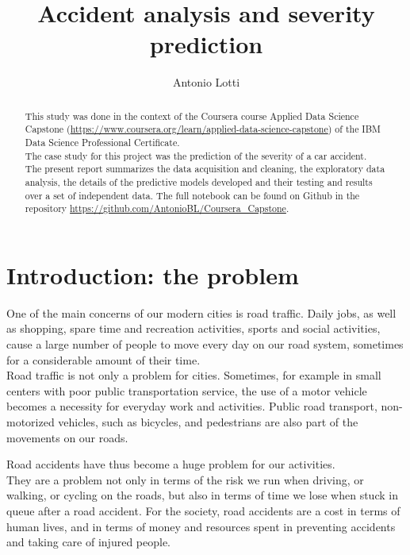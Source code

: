\documentclass[11pt]{article}
\title{Accident analysis and severity prediction}
\author{Antonio Lotti}
\begin{document}
    
    \maketitle
    
\begin{abstract}
This study was done in the context of the Coursera course Applied Data Science Capstone (\url{https://www.coursera.org/learn/applied-data-science-capstone}) of the IBM Data Science Professional Certificate.\\
The case study for this project was the prediction of the severity of a car accident.\\
The present report summarizes the data acquisition and cleaning, the exploratory data analysis, the details of the predictive models developed and their testing and results over a set of independent data.
The full notebook can be found on Github in the repository \url{https://github.com/AntonioBL/Coursera_Capstone}.
\end{abstract}

\tableofcontents

    \hypertarget{introduction}{%
\section{Introduction: the problem}\label{introduction}}

One of the main concerns of our modern cities is road traffic. Daily jobs, as well as shopping, spare time and recreation activities, sports and social activities, cause a large number of people to move every day on our road system, sometimes for a considerable amount of their time.\\
Road traffic is not only a problem for cities. Sometimes, for example in small centers with poor public transportation service, the use of a motor vehicle becomes a necessity for everyday work and activities. Public road transport, non-motorized vehicles, such as bicycles, and pedestrians are also part of the movements on our roads.

Road accidents have thus become a huge problem for our activities.\\
They are a problem not only in terms of the risk we run when driving, or walking, or cycling on the roads, but also in terms of time we lose when stuck in queue after a road accident. For the society, road accidents are a cost in terms of human lives, and in terms of money and resources spent in preventing accidents and taking care of injured people.
\end{document}
